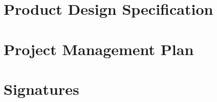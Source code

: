 \documentclass[hidelinks, 12pt]{article} %
\begin{document}
		\newpage
		\section{Product Design Specification}
		\label{Product_Design_Specification}
		
		\pagebreak
		
		\newpage
		\section{Project Management Plan}
		\label{Project_Management_Plan}
		
		\pagebreak
		
		\newpage
		\section{Signatures}
		\label{Signatures}
		
		\pagebreak
		
		\newpage
		\printglossary[type=\acronymtype]
		\pagebreak
		
		
	
\end{document}
